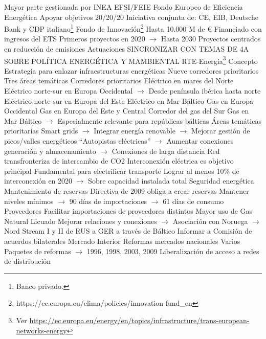 \documentclass{nuevotema}
\begin{document}
\begin{esquemal}
				\4 Mayor parte gestionada por INEA
			\3 EFSI/FEIE
			\3 Fondo Europeo de Eficiencia Energética
				\4 Apoyar objetivos 20/20/20
				\4 Iniciativa conjunta de:
				\4[] CE, EIB, Deutsche Bank y CDP italiano\footnote{Banco privado.}
			\3 Fondo de Innovación\footnote{https://ec.europa.eu/clima/policies/innovation-fund\_en}
				\4 Hasta 10.000 M de €
				\4 Financiado con ingresos del ETS
				\4 Primeros proyectos en 2020
				\4[] $\to$ Hasta 2030
				\4 Proyectos centrados en reducción de emisiones
		\2 Actuaciones
			\3 SINCRONIZAR CON TEMAS DE 4A SOBRE POLÍTICA ENERGÉTICA Y MAMBIENTAL
			\3 RTE-Energía\footnote{Ver \url{https://ec.europa.eu/energy/en/topics/infrastructure/trans-european-networks-energy}}
				\4 Concepto
				\4[] Estrategia para enlazar infraestructuras energéticas
				\4[] Nueve corredores prioritarios
				\4[] Tres áreas temáticas
				\4 Corredores prioritarios
				\4[] Eléctrico en mares del Norte
				\4[] Eléctrico norte-sur en Europa Occidental
				\4[] $\to$ Desde península ibérica  hasta norte
				\4[] Eléctrico norte-sur en Europa del Este
				\4[] Eléctrico en Mar Báltico
				\4[] Gas en Europa Occidental
				\4[] Gas en Europa del Este y Central
				\4[] Corredor del gas del Sur
				\4[] Gas en Mar Báltico
				\4[] $\to$ Especialmente relevante para repúblicas bálticas
				\4 Áreas temáticas prioritarias
				\4[] Smart grids
				\4[] $\to$ Integrar energía renovable
				\4[] $\to$ Mejorar gestión de picos/valles energéticos
				\4[] ``Autopistas eléctricas''
				\4[] $\to$ Aumentar conexiones generación y almacenamiento
				\4[] $\to$ Conexiones de larga distancia
				\4[] Red transfronteriza de intercambio de CO2
				\4 Interconexión eléctrica es objetivo principal
				\4[] Fundamental para electrificar transporte
				\4[] Lograr al menos 10\% de interconexión en 2020
				\4[] $\to$ Sobre capacidad instalada total
			\3 Seguridad energética
				\4 Mantenimiento de reservas
				\4[] Directiva de 2009 obliga a crear reservas
				\4[] Mantener niveles mínimos
				\4[] $\to$ 90 días de importaciones
				\4[] $\to$ 61 días de consumo
				\4 Proveedores
				\4[] Facilitar importaciones de proveedores distintos
				\4[] Mayor uso de Gas Natural Licuado
				\4[] Mejorar relaciones y conexiones
				\4[] $\to$ Asociación con Noruega
				\4[] $\to$ Nord Stream I y II de RUS a GER a través de Báltico
				\4 Informar a Comisión de acuerdos bilaterales
			\3 Mercado Interior
				\4 Reformas mercados nacionales
				\4[] Varios Paquetes de reformas
				\4[] $\to$ 1996, 1998, 2003, 2009
				\4[] Liberalización de acceso a redes de distribución

\end{esquemal}
\end{document}
